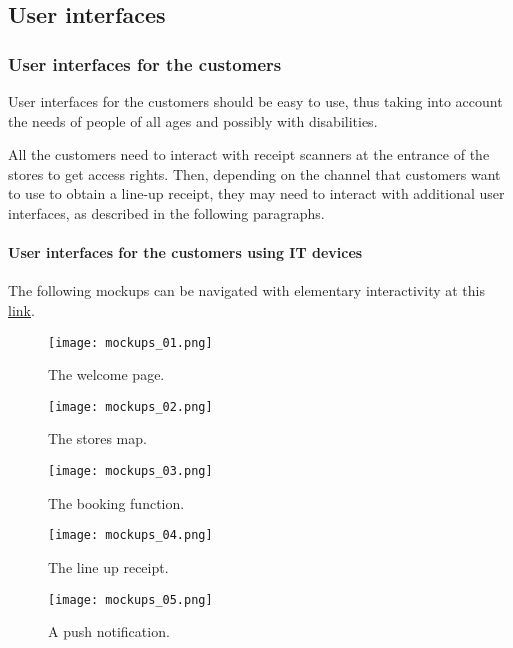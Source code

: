 \documentclass[../../main.tex]{subfiles}
\begin{document}
\subsection{User interfaces}

  \subsubsection{User interfaces for the customers}

  User interfaces for the customers should be easy to use, thus taking into
  account the needs of people of all ages and possibly with disabilities.

  All the customers need to interact with receipt scanners at the entrance of
  the stores to get access rights. Then, depending on
  the channel that customers want to use to obtain a line-up receipt, they may
  need to interact with additional user interfaces, as described in the
  following paragraphs.

  \paragraph{User interfaces for the customers using IT devices}

  The following mockups can be navigated with elementary interactivity at this \href{https://app.moqups.com/GnQbxBHNrI/view/page/ad64222d5?ui=0}{link}.

  \begin{figure}[h!]
    \centering
    \texttt{[image: mockups\_01.png]}
    \caption{The welcome page.}
  \end{figure}

  \begin{figure}[h!]
    \centering
    \texttt{[image: mockups\_02.png]}
    \caption{The stores map.}
  \end{figure}

  \begin{figure}[h!]
    \centering
    \texttt{[image: mockups\_03.png]}
    \caption{The booking function.}
  \end{figure}

  \begin{figure}[h!]
    \centering
    \texttt{[image: mockups\_04.png]}
    \caption{The line up receipt.}
  \end{figure}

  \begin{figure}[h!]
    \centering
    \texttt{[image: mockups\_05.png]}
    \caption{A push notification.}
  \end{figure}
\end{document}
